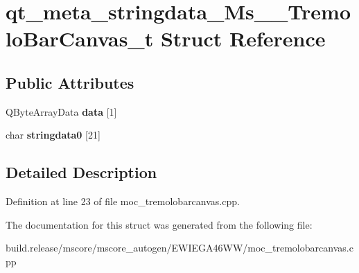 \hypertarget{structqt__meta__stringdata___ms_____tremolo_bar_canvas__t}{}\section{qt\+\_\+meta\+\_\+stringdata\+\_\+\+Ms\+\_\+\+\_\+\+Tremolo\+Bar\+Canvas\+\_\+t Struct Reference}
\label{structqt__meta__stringdata___ms_____tremolo_bar_canvas__t}
\subsection*{Public Attributes}
\begin{DoxyCompactItemize}
\item 
\mbox{\label{structqt__meta__stringdata___ms_____tremolo_bar_canvas__t_ac4781b2706af9bde9298cd1433205ea8}} 
Q\+Byte\+Array\+Data {\bfseries data} \mbox{[}1\mbox{]}
\item 
\mbox{\label{structqt__meta__stringdata___ms_____tremolo_bar_canvas__t_aa4a1c0b6d5247b89bcb6290f641bcc62}} 
char {\bfseries stringdata0} \mbox{[}21\mbox{]}
\end{DoxyCompactItemize}


\subsection{Detailed Description}


Definition at line 23 of file moc\+\_\+tremolobarcanvas.\+cpp.



The documentation for this struct was generated from the following file\+:\begin{DoxyCompactItemize}
\item 
build.\+release/mscore/mscore\+\_\+autogen/\+E\+W\+I\+E\+G\+A46\+W\+W/moc\+\_\+tremolobarcanvas.\+cpp\end{DoxyCompactItemize}
